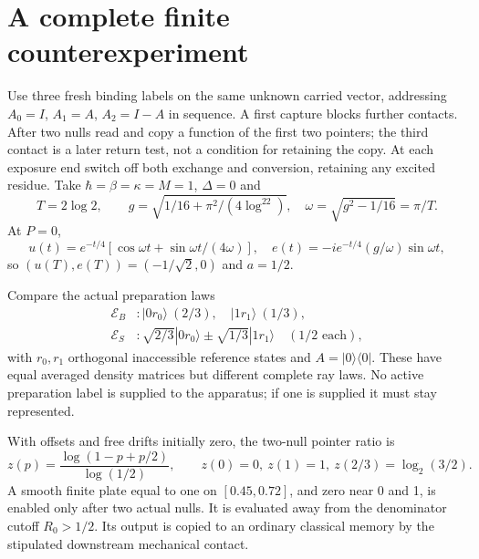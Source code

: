 \documentclass[11pt,oneside,openany]{book}
\theoremstyle{definition}
\theoremstyle{remark}\newtheorem{remark}[theorem]{Remark}
\begin{document}
\section{A complete finite counterexperiment}
\label{mat:counterexperiment}

Use three fresh binding labels on the same unknown carried vector, addressing $A_0=I$, $A_1=A$, $A_2=I-A$ in sequence. A first capture blocks further contacts. After two nulls read and copy a function of the first two pointers; the third contact is a later return test, not a condition for retaining the copy. At each exposure end switch off both exchange and conversion, retaining any excited residue. Take $\hbar=\beta=\kappa=M=1$, $\Delta=0$ and
\begin{equation}
 T=2\log2,\qquad g=\sqrt{1/16+\pi^2/(4\log^22)},
 \quad \omega=\sqrt{g^2-1/16}=\pi/T.
 \label{mat:parameters}
\end{equation}
At $P=0$,
\[
 u(t)=e^{-t/4}[\cos\omega t+\sin\omega t/(4\omega)],\quad
 e(t)=-ie^{-t/4}(g/\omega)\sin\omega t,
\]
so $(u(T),e(T))=(-1/\sqrt2,0)$ and $a=1/2$.

Compare the actual preparation laws
\begin{align}
 \mathcal E_B &: |0r_0\rangle\ (2/3),\quad |1r_1\rangle\ (1/3),\\
 \mathcal E_S &: \sqrt{2/3}|0r_0\rangle\pm\sqrt{1/3}|1r_1\rangle
                      \quad(1/2\text{ each}),
 \label{mat:ensembles}
\end{align}
with $r_0,r_1$ orthogonal inaccessible reference states and $A=|0\rangle\langle0|$. These have equal averaged density matrices but different complete ray laws. No active preparation label is supplied to the apparatus; if one is supplied it must stay represented.

With offsets and free drifts initially zero, the two-null pointer ratio is
\[
 z(p)=\frac{\log(1-p+p/2)}{\log(1/2)},
 \qquad z(0)=0,\ z(1)=1,\ z(2/3)=\log_2(3/2).
\]
A smooth finite plate equal to one on $[0.45,0.72]$, and zero near 0 and 1, is enabled only after two actual nulls. It is evaluated away from the denominator cutoff $R_0>1/2$. Its output is copied to an ordinary classical memory by the stipulated downstream mechanical contact.
\end{document}
